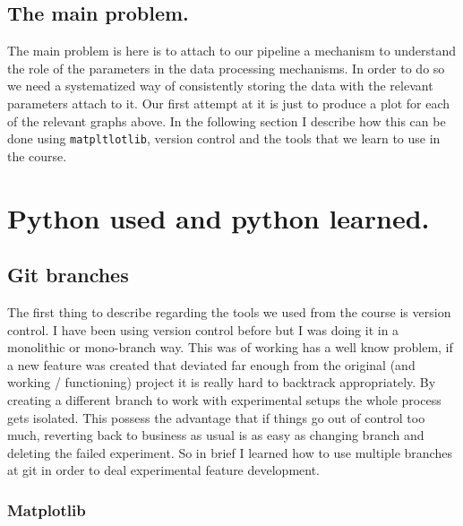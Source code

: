 \documentclass[11pt,a4paper]{article}
\begin{document}
\subsection{The main problem.}\label{the-main-problem.}

The main problem is here is to attach to our pipeline a mechanism to
understand the role of the parameters in the data processing mechanisms.
In order to do so we need a systematized way of consistently storing the
data with the relevant parameters attach to it. Our first attempt at it
is just to produce a plot for each of the relevant graphs above. In the
following section I describe how this can be done using
\texttt{matpltlotlib}, version control and the tools that we learn to
use in the course.

\section{Python used and python
learned.}\label{python-used-and-python-learned.}

\subsection{Git branches}\label{git-branches}

The first thing to describe regarding the tools we used from the course is
version control. I have been using version control before but I was
doing it in a monolithic or mono-branch way. This was of working has a well know problem, if a new feature was created that deviated far enough from the
original (and working / functioning) project it is really hard to backtrack
appropriately. By creating a different branch to work with
experimental setups the whole process gets isolated. This possess the advantage that if things go out
of control too much, reverting back to business as usual is as easy as
changing branch and deleting the failed experiment. So in brief I learned how to
use multiple branches at git in order to deal experimental feature
development.

\subsubsection{Matplotlib}\label{matplotlib}
\end{document}
